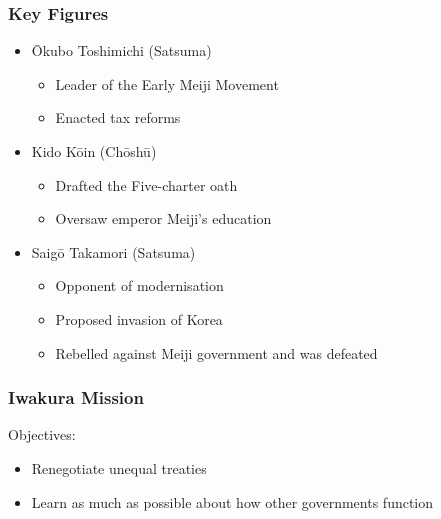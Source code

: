 \documentclass[class=article, crop=false]{standalone}
\begin{document}
  \subsubsection{Key Figures}
  \begin{itemize}
    \item \=Okubo Toshimichi (Satsuma)
    \begin{itemize}
      \item Leader of the Early Meiji Movement
      \item Enacted tax reforms
    \end{itemize}
    \item Kido K\=oin (Ch\=osh\=u)
    \begin{itemize}
      \item Drafted the Five-charter oath
      \item Oversaw emperor Meiji's education
    \end{itemize}
    \item Saig\=o Takamori (Satsuma)
    \begin{itemize}
      \item Opponent of modernisation
      \item Proposed invasion of Korea
      \item Rebelled against Meiji government and was defeated
    \end{itemize}
  \end{itemize}
  \subsubsection{Iwakura Mission}
  Objectives:
  \begin{itemize}
    \item Renegotiate unequal treaties
    \item Learn as much as possible about how other governments function
  \end{itemize}
\end{document}
